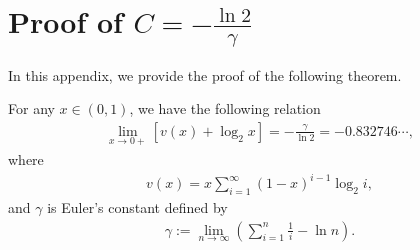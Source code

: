 \section{Proof of $C=-\frac{\ln 2}{\gamma}$}\label{appendix:A}
In this appendix, we provide the proof of the following theorem.
\begin{theorem}
For any $x\in(0,1)$, we have the following relation
\begin{align}
	\lim_{x\to 0+} \left[ v(x) + \log_2 x \right] = -\frac{\gamma}{\ln 2} = -0.832746\cdots,
\end{align}
where
\begin{align}
	v(x) = x\sum_{i=1}^{\infty} (1-x)^{i-1}\log_2 i,
\end{align}
and $\gamma$ is Euler's constant defined by
\begin{align}\label{eq:gamma_def}
	\gamma := \lim_{n\to\infty}\left(\sum_{i=1}^{n} \frac{1}{i}-\ln n\right).
\end{align}
\end{theorem}
%
